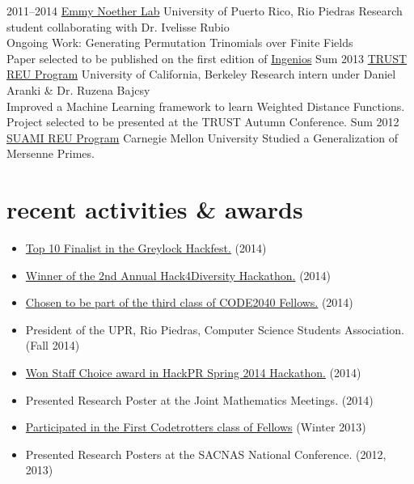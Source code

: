 \documentclass[]{friggeri-cv}
\begin{document}
\begin{entrylist}
\entry
{2011--2014}
{\href{http://ccom.uprrp.edu/~labemmy/?page_id=868}{Emmy Noether Lab}}
{University of Puerto Rico, Rio Piedras}
{Research student collaborating with Dr. Ivelisse Rubio \\
Ongoing Work: Generating Permutation Trinomials over Finite Fields \\
Paper selected to be published on the first edition of \href{http://www.ingeniosupr.com/}{Ingenios}}
\entry
{Sum 2013}
{\href{https://www.truststc.org/education/reu/13/index.html}{TRUST REU Program}}
{University of California, Berkeley}
{Research intern under Daniel Aranki \& Dr. Ruzena Bajcsy \\
Improved a Machine Learning framework to learn Weighted Distance Functions. \\
Project selected to be presented at the TRUST Autumn Conference.}
\entry
{Sum 2012}
{\href{http://www.math.cmu.edu/cna/summer_institute.html}{SUAMI REU Program}}
{Carnegie Mellon University}
{Studied a Generalization of Mersenne Primes.}
\end{entrylist}


\section{recent activities \& awards}
\begin{itemize}
\item \href{http://greylocku.com/hackfest/}{Top 10 Finalist in the Greylock Hackfest.} (2014)
\item \href{https://www.eventbrite.com/e/2nd-annual-hack4diversity-closing-the-gap-tickets-11888106647}{Winner of the 2nd Annual Hack4Diversity Hackathon.} (2014)
\item \href{http://code2040.org}{Chosen to be part of the third class of CODE2040 Fellows.} (2014)
\item President of the UPR, Rio Piedras, Computer Science Students Association. (Fall 2014)
\item \href{https://github.com/chrisrodz/gh-backups}{Won Staff Choice award in HackPR Spring 2014 Hackathon.} (2014)
\item Presented Research Poster at the Joint Mathematics Meetings. (2014)
\item \href{http://codetrotters.com}{Participated in the First Codetrotters class of Fellows} (Winter 2013)
\item Presented Research Posters at the SACNAS National Conference. (2012, 2013)
\end{itemize}
\end{document}
